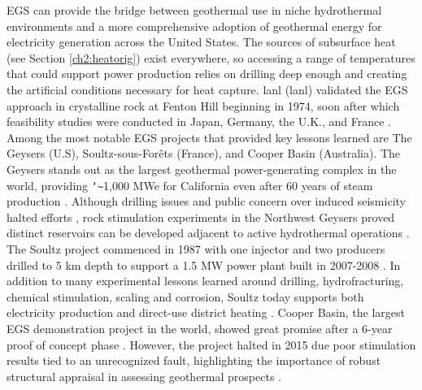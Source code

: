 EGS can provide the bridge between geothermal use in niche hydrothermal environments and a more comprehensive adoption of geothermal energy for electricity generation across the United States. The sources of subsurface heat (see Section \ref{ch2:heatorig}) exist everywhere, so accessing a range of temperatures that could support power production relies on drilling deep enough and creating the artificial conditions necessary for heat capture. \acrlong{lanl} (\acrshort{lanl}) validated the EGS approach in crystalline rock at Fenton Hill beginning in 1974, soon after which feasibility studies were conducted in Japan, Germany, the U.K., and France \citep{breede_systematic_2013}. Among the most notable EGS projects that provided key lessons learned are The Geysers (U.S), Soultz-sous-Forêts (France), and Cooper Basin (Australia). The Geysers stands out as the largest geothermal power-generating complex in the world, providing \texttt{\char`\~}1,000 MWe for California even after 60 years of steam production \citep{jelacic_evaluation_2008,williams_assessment_2008}. Although drilling issues and public concern over induced seismicity halted efforts \citep{manish03_united_2009}, rock stimulation experiments in the Northwest Geysers proved distinct reservoirs can be developed adjacent to active hydrothermal operations \citep{pan_establishment_2019}. The Soultz project commenced in 1987 with one injector and two producers drilled to 5 km depth to support a 1.5 MW power plant built in 2007-2008 \citep[~p. 463]{dipippo_geothermal_2012}. In addition to many experimental lessons learned around drilling, hydrofracturing, chemical stimulation, scaling and corrosion, Soultz today supports both electricity production and direct-use district heating \citep{durst_overview_2013}. Cooper Basin, the largest EGS demonstration project in the world, showed great promise after a 6-year proof of concept phase \citep{stephens_assessing_2010}. However, the project halted in 2015 due poor stimulation results tied to an unrecognized fault, highlighting the importance of robust structural appraisal in assessing geothermal prospects \citep{holl_what_2015}. 

